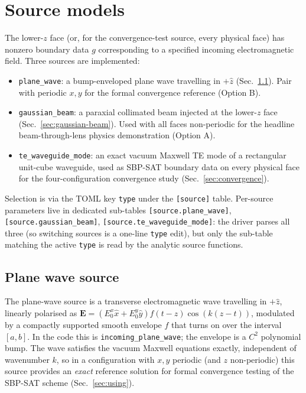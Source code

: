\documentclass[11pt]{article}
\newcommand{\vE}{\mathbf{E}}
\newcommand{\hx}{\hat{x}}
\newcommand{\hy}{\hat{y}}
\newcommand{\hz}{\hat{z}}
\begin{document}
\section{Source models}
\label{sec:sources}

The lower-$z$ face (or, for the convergence-test source, every
physical face) has nonzero boundary data $g$ corresponding to a
specified incoming electromagnetic field. Three sources are
implemented:
\begin{itemize}
  \item \texttt{plane\_wave}: a bump-enveloped plane wave travelling
    in $+\hz$ (Sec.~\ref{sec:plane-wave}). Pair with periodic $x, y$
    for the formal convergence reference (Option B).
  \item \texttt{gaussian\_beam}: a paraxial collimated beam injected
    at the lower-$z$ face (Sec.~\ref{sec:gaussian-beam}). Used with
    all faces non-periodic for the headline beam-through-lens
    physics demonstration (Option A).
  \item \texttt{te\_waveguide\_mode}: an exact vacuum Maxwell
    TE mode of a rectangular unit-cube waveguide, used as SBP-SAT
    boundary data on every physical face for the four-configuration
    convergence study (Sec.~\ref{sec:convergence}).
\end{itemize}
Selection is via the TOML key \texttt{type} under the \texttt{[source]}
table. Per-source parameters live in dedicated sub-tables
\texttt{[source.plane\_wave]}, \texttt{[source.gaussian\_beam]},
\texttt{[source.te\_waveguide\_mode]}: the driver parses all three
(so switching sources is a one-line \texttt{type} edit), but only the
sub-table matching the active \texttt{type} is read by the analytic
source functions.

\subsection{Plane wave source}
\label{sec:plane-wave}

The plane-wave source is a transverse electromagnetic wave travelling
in $+\hz$, linearly polarised as $\vE = (E_0^x \hx + E_0^y \hy)
f(t - z) \cos(k(z - t))$, modulated by a compactly supported smooth
envelope $f$ that turns on over the interval $[a, b]$. In the code
this is \texttt{incoming\_plane\_wave}; the envelope is a $C^2$
polynomial bump. The wave satisfies the vacuum Maxwell equations
exactly, independent of wavenumber $k$, so in a configuration with
$x, y$ periodic (and $z$ non-periodic) this source provides an
\emph{exact} reference solution for formal convergence testing of
the SBP-SAT scheme (Sec.~\ref{sec:using}).
\end{document}
